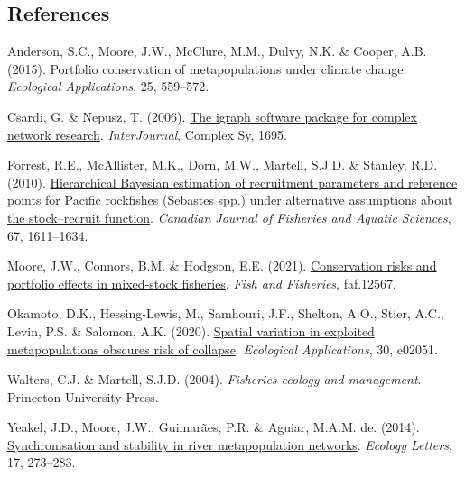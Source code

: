 \documentclass[
]{article}
\newlength{\cslhangindent}
\newlength{\cslentryspacingunit} %
\newenvironment{CSLReferences}[2] %
 {%
  \setlength{\parindent}{0pt}
  \ifodd #1
  \let\oldpar\par
  \def\par{\hangindent=\cslhangindent\oldpar}
  \fi
  \setlength{\parskip}{#2\cslentryspacingunit}
 }%
 {}
\begin{document}
\hypertarget{references}{%
\subsection{References}\label{references}}

\vspace{3truemm}

\hypertarget{refs}{}
\begin{CSLReferences}{1}{0}
\leavevmode{}%
Anderson, S.C., Moore, J.W., McClure, M.M., Dulvy, N.K. \& Cooper, A.B.
(2015). {Portfolio conservation of metapopulations under climate
change.} \emph{Ecological Applications}, 25, 559--572.

\leavevmode{}%
Csardi, G. \& Nepusz, T. (2006). \href{https://igraph.org}{{The igraph
software package for complex network research}}. \emph{InterJournal},
Complex Sy, 1695.

\leavevmode{}%
Forrest, R.E., McAllister, M.K., Dorn, M.W., Martell, S.J.D. \& Stanley,
R.D. (2010). \href{https://doi.org/10.1139/f10-077}{{Hierarchical
Bayesian estimation of recruitment parameters and reference points for
Pacific rockfishes (Sebastes spp.) under alternative assumptions about
the stock--recruit function}}. \emph{Canadian Journal of Fisheries and
Aquatic Sciences}, 67, 1611--1634.

\leavevmode{}%
Moore, J.W., Connors, B.M. \& Hodgson, E.E. (2021).
\href{https://doi.org/10.1111/faf.12567}{{Conservation risks and
portfolio effects in mixed‐stock fisheries}}. \emph{Fish and Fisheries},
faf.12567.

\leavevmode{}%
Okamoto, D.K., Hessing‐Lewis, M., Samhouri, J.F., Shelton, A.O., Stier,
A.C., Levin, P.S. \& Salomon, A.K. (2020).
\href{https://doi.org/10.1002/eap.2051}{{Spatial variation in exploited
metapopulations obscures risk of collapse}}. \emph{Ecological
Applications}, 30, e02051.

\leavevmode{}%
Walters, C.J. \& Martell, S.J.D. (2004). \emph{{Fisheries ecology and
management}}. Princeton University Press.

\leavevmode{}%
Yeakel, J.D., Moore, J.W., Guimarães, P.R. \& Aguiar, M.A.M. de. (2014).
\href{https://doi.org/10.1111/ele.12228}{{Synchronisation and stability
in river metapopulation networks}}. \emph{Ecology Letters}, 17,
273--283.

\end{CSLReferences}
\end{document}
